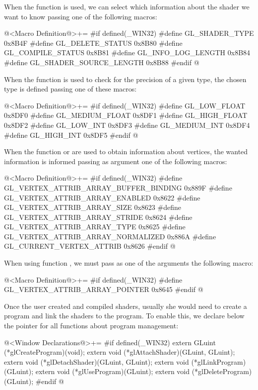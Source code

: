 When the function  is used, we can select
which information about the shader we want to know passing one of the
following macros:

\iniciocodigo
@<Macro Definition@>+=
#if defined(_WIN32)
#define GL_SHADER_TYPE          0x8B4F
#define GL_DELETE_STATUS        0x8B80
#define GL_COMPILE_STATUS       0x8B81
#define GL_INFO_LOG_LENGTH      0x8B84
#define GL_SHADER_SOURCE_LENGTH 0x8B88
#endif
@
\fimcodigo

When the function  is used to
check for the precision of a given type, the chosen type is defined
passing one of these macros:

\iniciocodigo
@<Macro Definition@>+=
#if defined(_WIN32)
#define GL_LOW_FLOAT    0x8DF0
#define GL_MEDIUM_FLOAT 0x8DF1
#define GL_HIGH_FLOAT   0x8DF2
#define GL_LOW_INT      0x8DF3
#define GL_MEDIUM_INT   0x8DF4
#define GL_HIGH_INT     0x8DF5
#endif
@
\fimcodigo

When the function 
or  are used to obtain information
about vertices, the wanted information is informed passing as argument
one of the following macros:

\iniciocodigo
@<Macro Definition@>+=
#if defined(_WIN32)
#define GL_VERTEX_ATTRIB_ARRAY_BUFFER_BINDING 0x889F
#define GL_VERTEX_ATTRIB_ARRAY_ENABLED        0x8622
#define GL_VERTEX_ATTRIB_ARRAY_SIZE           0x8623
#define GL_VERTEX_ATTRIB_ARRAY_STRIDE         0x8624
#define GL_VERTEX_ATTRIB_ARRAY_TYPE           0x8625
#define GL_VERTEX_ATTRIB_ARRAY_NORMALIZED     0x886A
#define GL_CURRENT_VERTEX_ATTRIB              0x8626
#endif
@
\fimcodigo

When using function , we must
pass as one of the arguments the following macro:

\iniciocodigo
@<Macro Definition@>+=
#if defined(_WIN32)
#define GL_VERTEX_ATTRIB_ARRAY_POINTER 0x8645
#endif
@
\fimcodigo

Once the user created and compiled shaders, usually she would need to
create a program and link the shaders to the program. To enable this,
we declare below the pointer for all functions about program
management:

\iniciocodigo
@<Window Declarations@>+=
#if defined(_WIN32)
extern GLuint (*glCreateProgram)(void);
extern void (*glAttachShader)(GLuint, GLuint);
extern void (*glDetachShader)(GLuint, GLuint);
extern void (*glLinkProgram)(GLuint);
extern void (*glUseProgram)(GLuint);
extern void (*glDeleteProgram)(GLuint);
#endif
@
\fimcodigo

